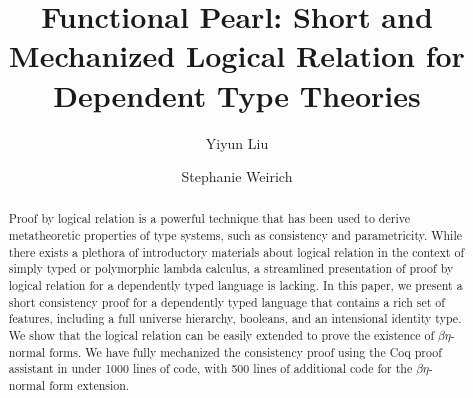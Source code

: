 \documentclass[acmsmall,screen=true,
\ifpublic review=false\else,review=true\fi
  ,anonymous=\ifanonymous true\else false\fi]{acmart}
\begin{document}
\title{Functional Pearl: Short and Mechanized Logical Relation for Dependent Type Theories}

\author{Yiyun Liu}

\author{Stephanie Weirich}


\begin{abstract}
Proof by logical relation is a powerful technique that has been used
to derive metatheoretic properties of type systems, such as
consistency and parametricity. While there exists a
plethora of introductory materials about logical relation in the
context of simply typed or polymorphic lambda calculus, a streamlined
presentation of proof by logical relation for a dependently typed language
is lacking. In this paper, we present a short
consistency proof for a dependently typed language that contains a
rich set of features, including a full universe
hierarchy, booleans, and an intensional identity type. We show that
the logical relation can be easily extended to prove the existence of
$\beta\eta$-normal forms.
We have
fully mechanized the consistency proof using the Coq proof assistant
in under 1000 lines of code, with 500 lines of additional code for the
$\beta\eta$-normal form extension.
\end{abstract}

\end{document}
